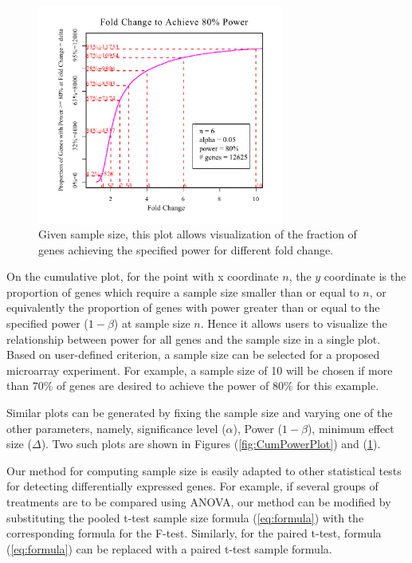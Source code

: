 \documentclass{bioinfo}
\begin{document}
\begin{figure}[h]
  \centerline{\includegraphics*[width=3.2in]{CumFoldChangePlotP.pdf}}
  \caption[Given Sample Size, Fold Change (Effect Size) Necessary to
    Achieving a Specified Power]{Given sample size, this plot allows visualization of the fraction of genes achieving the specified power for different fold change.}
  \label{fig:CumFoldChangePlot}
\end{figure}

On the cumulative plot, for the point with x coordinate $n$, the
$y$ coordinate is the proportion of genes which require a sample
size smaller than or equal to $n$, or equivalently the proportion
of genes with power greater than or equal to the specified power
($1-\beta$) at sample size $n$. Hence it allows users to visualize
the relationship between power for all genes and the sample size
in a single plot. Based on user-defined criterion, a sample size
can be selected for a proposed microarray experiment. For example,
a sample size of 10 will be chosen if more than $70\%$ of genes
are desired to achieve the power of $80\%$ for this example.

Similar plots can be generated by fixing the sample size and
varying one of the other parameters, namely, significance level
($\alpha$), Power ($1-\beta$), minimum effect size ($\Delta$). Two
such plots are shown in Figures (\ref{fig:CumPowerPlot}) and
(\ref{fig:CumFoldChangePlot}).

Our method for computing sample size is easily adapted to other
statistical tests for detecting differentially expressed genes. For
example, if several groups of treatments are to be compared using
ANOVA, our method can be modified by substituting the pooled t-test
sample size formula (\ref{eq:formula}) with the corresponding
formula for the F-test. Similarly, for the paired t-test, formula
(\ref{eq:formula}) can be replaced with a paired t-test sample
formula.
\end{document}
